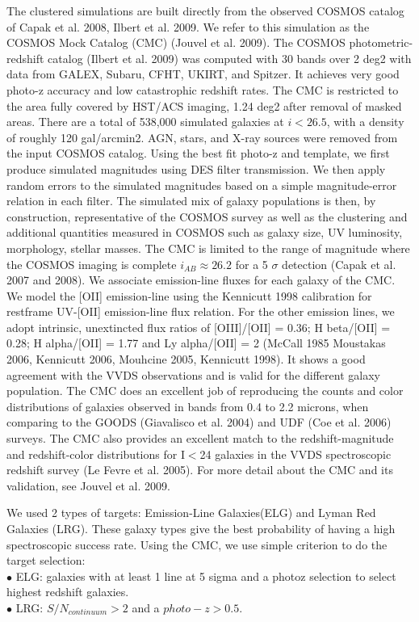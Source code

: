 \documentclass{article}
\begin{document}
The clustered simulations are built directly from the observed
COSMOS catalog of Capak et al. 2008, Ilbert et al. 2009. We refer to this simulation as the
COSMOS Mock Catalog (CMC) (Jouvel et al. 2009).
The COSMOS photometric-redshift catalog (Ilbert et al. 2009) was computed with 30 bands over 2 deg2
with data from GALEX, Subaru, CFHT, UKIRT, and Spitzer.
It achieves very good photo-z accuracy and low catastrophic redshift rates.
The CMC is restricted to the area fully covered by
HST/ACS imaging, 1.24 deg2 after removal of masked areas. There are a total of 538,000 simulated
galaxies at $i<26.5$, with a density of roughly 120 gal/arcmin2.
AGN, stars, and X-ray sources were removed from the input COSMOS catalog.
Using the best fit photo-z and template, we first produce simulated magnitudes
using DES filter transmission.
We then apply random errors to the simulated magnitudes based on a simple magnitude-error
relation in each filter. The simulated mix of galaxy populations is then, by construction,
representative of the COSMOS survey as well as the clustering and additional quantities measured in COSMOS such as
galaxy size, UV luminosity, morphology, stellar masses.
The CMC is limited to the range of magnitude
where the COSMOS imaging is complete $i_{AB} \approx 26.2$ for a 5 $\sigma$ detection (Capak et al. 2007 and 2008).
We associate emission-line fluxes for each galaxy of the CMC. We model the [OII] emission-line
using the Kennicutt 1998 calibration for restframe UV-[OII] emission-line flux relation.
For the other emission lines, we adopt intrinsic,
unextincted flux ratios of [OIII]/[OII] = 0.36; H beta/[OII] = 0.28; H alpha/[OII] = 1.77
and Ly alpha/[OII] = 2 (McCall 1985 Moustakas 2006, Kennicutt 2006, Mouhcine 2005, Kennicutt 1998).
It shows a good agreement with the VVDS observations
and is valid for the different galaxy population.
The CMC does an excellent job of reproducing the counts and color distributions of galaxies observed
in bands from 0.4 to 2.2 microns, when comparing to the GOODS (Giavalisco et al. 2004) and
UDF (Coe et al. 2006) surveys. The CMC also provides an excellent match to the redshift-magnitude
and redshift-color distributions for I$<$24 galaxies in the VVDS spectroscopic redshift survey (Le Fevre et al. 2005).
For more detail about the CMC and its validation, see Jouvel et al. 2009.

We used 2 types of targets: Emission-Line Galaxies(ELG) and Lyman Red Galaxies (LRG).
These galaxy types give the best probability of having a high spectroscopic success rate.
Using the CMC, we use simple criterion to do the target selection:\\
{$\bullet$} ELG: galaxies with at least 1 line at 5 sigma and a photoz selection to select highest redshift galaxies.\\
{$\bullet$} LRG: $S/N_{continuum}>2$ and a $photo-z>0.5$. 
\end{document}
